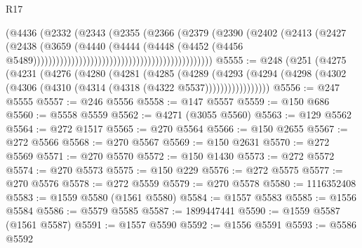 \begin{lexlean}{R17}
\begin{coremodule}
                                                                (@4436
                                                                  (@2332
                                                                    (@2343
                                                                      (@2355
                                                                        (@2366
                                                                          (@2379
                                                                            (@2390
                                                                              (@2402
                                                                                (@2413
                                                                                  (@2427
                                                                                    (@2438
                                                                                      (@3659
                                                                                        (@4440
                                                                                          (@4444
                                                                                            (@4448
                                                                                              (@4452
                                                                                                (@4456
                                                                                                  @5489)))))))))))))))))))))))))))))))))))))))))))))))
@5555 := @248
    (@251
      (@4275
        (@4231
          (@4276
            (@4280
              (@4281
                (@4285
                  (@4289
                    (@4293
                      (@4294 (@4298 (@4302 (@4306 (@4310 (@4314 (@4318 (@4322 @5537)))))))))))))))))
@5556 := @247 @5555
@5557 := @246 @5556
@5558 := @147 @5557
@5559 := @150 @686
@5560 := @5558 @5559
@5562 := @4271 (@3055 @5560)
@5563 := @129 @5562
@5564 := @272 @1517
@5565 := @270 @5564
@5566 := @150 @2655
@5567 := @272 @5566
@5568 := @270 @5567
@5569 := @150 @2631
@5570 := @272 @5569
@5571 := @270 @5570
@5572 := @150 @1430
@5573 := @272 @5572
@5574 := @270 @5573
@5575 := @150 @229
@5576 := @272 @5575
@5577 := @270 @5576
@5578 := @272 @5559
@5579 := @270 @5578
@5580 := 1116352408
@5583 := @1559 @5580 (@1561 @5580)
@5584 := @1557 @5583
@5585 := @1556 @5584
@5586 := @5579 @5585
@5587 := 1899447441
@5590 := @1559 @5587 (@1561 @5587)
@5591 := @1557 @5590
@5592 := @1556 @5591
@5593 := @5586 @5592

\end{coremodule}
\end{lexlean}
